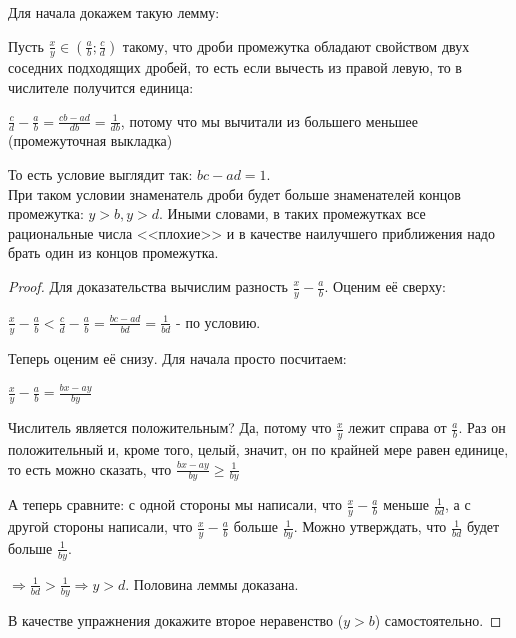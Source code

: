 \documentclass[russian]{lecture-notes}
\begin{document}
		Для начала докажем такую лемму:
		\begin{lemma}
			Пусть $\frac{x}{y} \in (\frac{a}{b}; \frac{c}{d})$ такому, что дроби промежутка обладают свойством двух соседних подходящих дробей, то есть если вычесть из правой левую, то в числителе получится единица:
			
			$\frac{c}{d} - \frac{a}{b} = \frac{cb-ad}{db} = \frac{1}{db}$, потому что мы вычитали из большего меньшее (промежуточная выкладка)
			
			То есть условие выглядит так: $bc - ad = 1$. 
			\\При таком условии знаменатель дроби будет больше знаменателей концов промежутка: $y > b, y > d$. Иными словами,  в таких промежутках все рациональные числа <<плохие>> и в качестве наилучшего приближения надо брать один из концов промежутка.
		\end{lemma}
		\begin{proof}
			Для доказательства вычислим разность $\frac{x}{y} - \frac{a}{b}$. Оценим её сверху: 
			
			$\frac{x}{y} - \frac{a}{b} < \frac{c}{d} - \frac{a}{b} = \frac{bc-ad}{bd} = \frac{1}{bd}$ - по условию.
			
			Теперь оценим её снизу. Для начала просто посчитаем:
			
			$\frac{x}{y} - \frac{a}{b} = \frac{bx-ay}{by}$
			
			Числитель является положительным? Да, потому что $\frac{x}{y}$ лежит справа от $\frac{a}{b}$. Раз он положительный и, кроме того, целый, значит, он по крайней мере равен единице, то есть можно сказать, что $\frac{bx-ay}{by} \geq \frac{1}{by}$
			
			А теперь сравните: с одной стороны мы написали, что $\frac{x}{y} - \frac{a}{b}$ меньше $\frac{1}{bd}$, а с другой стороны написали, что $\frac{x}{y} - \frac{a}{b}$ больше $\frac{1}{by}$. Можно утверждать, что $\frac{1}{bd}$ будет больше $\frac{1}{by}$. 
			
			$\Rightarrow \frac{1}{bd} > \frac{1}{by} \Rightarrow y > d$. Половина леммы доказана.
			
			В качестве упражнения докажите второе неравенство ($y > b$) самостоятельно.
		\end{proof}	
		
\end{document}
